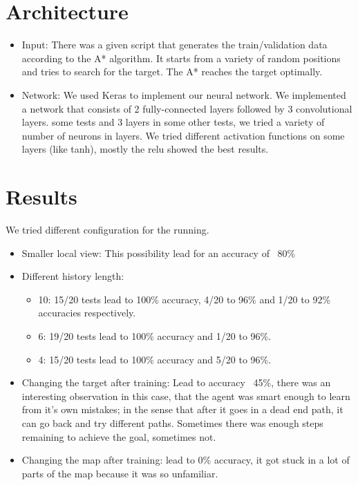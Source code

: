 \documentclass[a4paper]{article}
\begin{document}
\section{Architecture}
\begin{itemize}
\item Input: There was a given script that generates the train/validation data according to the A* algorithm. It starts from a variety of random positions and tries to search for the target. The A* reaches the target optimally.

\item Network: We used Keras to implement our neural network. We implemented a network that consists of 2 fully-connected layers followed by 3 convolutional layers. some tests and 3 layers in some other tests, we tried a variety of number of neurons in layers. We tried different activation functions on some layers (like tanh), mostly the relu showed the best results.
\end{itemize}

\section{Results}
We tried different configuration for the running.
\begin{itemize}
\item Smaller local view: This possibility lead for an accuracy of ~80\%
\item Different history length: 
	\begin{itemize}
		\item 10: 15/20 tests lead to 100\% accuracy, 4/20 to 96\% and 1/20 to 92\% accuracies respectively.
		\item 6: 19/20 tests lead to 100\% accuracy and 1/20 to 96\%.
		\item 4: 15/20 tests lead to 100\% accuracy and 5/20 to 96\%.
	\end{itemize}
\item Changing the target after training: Lead to accuracy ~45\%, there was an interesting observation in this case, that the agent was smart enough to learn from it's own mistakes; in the sense that after it goes in a dead end path, it can go back and try different paths. Sometimes there was enough steps remaining to achieve the goal, sometimes not.
\item Changing the map after training: lead to 0\% accuracy, it got stuck in a lot of parts of the map because it was so unfamiliar.


\end{itemize}
\end{document}
